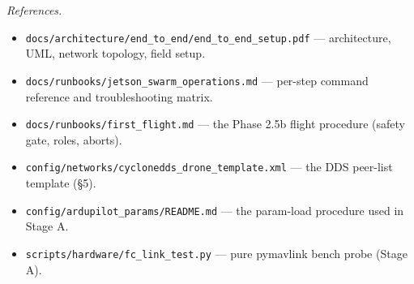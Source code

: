 \documentclass[11pt,a4paper]{article}
\begin{document}
\vspace{1.2cm}

\hrulefill

\vspace{0.4cm}

\noindent\small\textit{References.}
\begin{itemize}[leftmargin=*, itemsep=1pt]
  \item \texttt{docs/architecture/end\_to\_end/end\_to\_end\_setup.pdf} --- architecture, UML, network topology, field setup.
  \item \texttt{docs/runbooks/jetson\_swarm\_operations.md} --- per-step command reference and troubleshooting matrix.
  \item \texttt{docs/runbooks/first\_flight.md} --- the Phase 2.5b flight procedure (safety gate, roles, aborts).
  \item \texttt{config/networks/cyclonedds\_drone\_template.xml} --- the DDS peer-list template (§5).
  \item \texttt{config/ardupilot\_params/README.md} --- the param-load procedure used in Stage A.
  \item \texttt{scripts/hardware/fc\_link\_test.py} --- pure pymavlink bench probe (Stage A).
\end{itemize}
\end{document}
